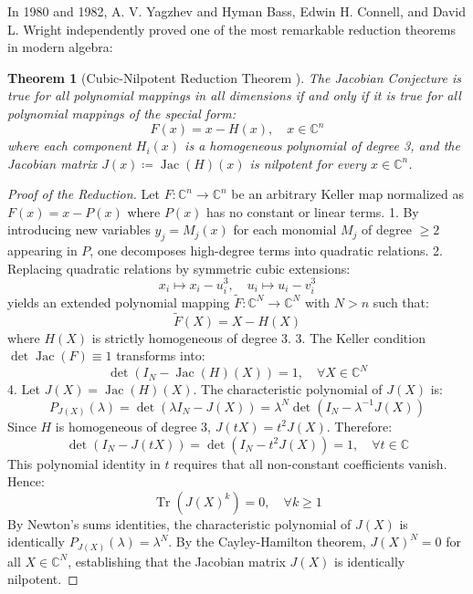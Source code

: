 \documentclass[11pt,a4paper]{article}
\newtheorem{theorem}{Theorem}[section]
\theoremstyle{definition}
\begin{document}
In 1980 and 1982, A. V. Yagzhev \cite{yagzhev1980} and Hyman Bass, Edwin H. Connell, and David L. Wright \cite{bass1982} independently proved one of the most remarkable reduction theorems in modern algebra:

\begin{theorem}[Cubic-Nilpotent Reduction Theorem \cite{bass1982, yagzhev1980}]\label{thm:bcw_reduction}
The Jacobian Conjecture is true for all polynomial mappings in all dimensions if and only if it is true for all polynomial mappings of the special form:
\begin{equation}\label{eq:cubic_form}
F(x) = x - H(x), \quad x \in \mathbb{C}^n
\end{equation}
where each component $H_i(x)$ is a homogeneous polynomial of degree 3, and the Jacobian matrix $J(x) \coloneqq \operatorname{Jac}(H)(x)$ is nilpotent for every $x \in \mathbb{C}^n$.
\end{theorem}

\begin{proof}[Proof of the Reduction]
Let $F: \mathbb{C}^n \to \mathbb{C}^n$ be an arbitrary Keller map normalized as $F(x) = x - P(x)$ where $P(x)$ has no constant or linear terms.
1. By introducing new variables $y_j = M_j(x)$ for each monomial $M_j$ of degree $\ge 2$ appearing in $P$, one decomposes high-degree terms into quadratic relations.
2. Replacing quadratic relations by symmetric cubic extensions:
\[ x_i \mapsto x_i - u_i^3, \quad u_i \mapsto u_i - v_i^3 \]
yields an extended polynomial mapping $\widetilde{F}: \mathbb{C}^N \to \mathbb{C}^N$ with $N > n$ such that:
\[ \widetilde{F}(X) = X - H(X) \]
where $H(X)$ is strictly homogeneous of degree 3.
3. The Keller condition $\det \operatorname{Jac}(F) \equiv 1$ transforms into:
\[ \det(I_N - \operatorname{Jac}(H)(X)) = 1, \quad \forall X \in \mathbb{C}^N \]
4. Let $J(X) = \operatorname{Jac}(H)(X)$. The characteristic polynomial of $J(X)$ is:
\[ P_{J(X)}(\lambda) = \det(\lambda I_N - J(X)) = \lambda^N \det(I_N - \lambda^{-1} J(X)) \]
Since $H$ is homogeneous of degree 3, $J(t X) = t^2 J(X)$. Therefore:
\[ \det(I_N - J(t X)) = \det(I_N - t^2 J(X)) = 1, \quad \forall t \in \mathbb{C} \]
This polynomial identity in $t$ requires that all non-constant coefficients vanish. Hence:
\[ \operatorname{Tr}(J(X)^k) = 0, \quad \forall k \ge 1 \]
By Newton's sums identities, the characteristic polynomial of $J(X)$ is identically $P_{J(X)}(\lambda) = \lambda^N$.
By the Cayley-Hamilton theorem, $J(X)^N = 0$ for all $X \in \mathbb{C}^N$, establishing that the Jacobian matrix $J(X)$ is identically nilpotent.
\end{proof}
\end{document}
